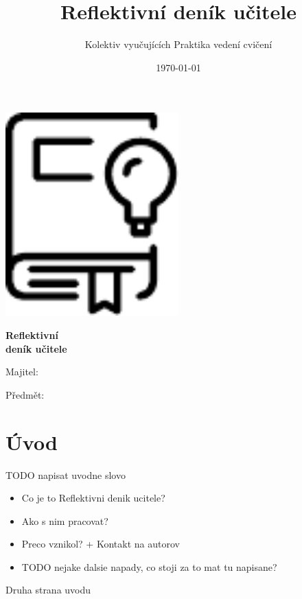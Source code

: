 \documentclass[twoside,openany,10pt]{book}
\title{Reflektivní deník učitele}
\author{Kolektiv vyučujících Praktika vedení cvičení}
\date{\today}
\begin{document}
\begin{titlepage}
	\centering
    \vspace*{1cm}
	\includegraphics[width=0.5\textwidth]{img/diary}\par
	\vspace{0.5cm}
	{\huge\bfseries Reflektivní\\ deník učitele\par}
	\vfill
	\raggedright
    \Large
	Majitel:\par
    \vspace{0.2cm}
    Předmět:\par
\end{titlepage}


\chapter*{Úvod}

TODO napisat uvodne slovo

\begin{itemize}
\item Co je to Reflektivni denik ucitele?
\item Ako s nim pracovat?
\item Preco vznikol? + Kontakt na autorov
\item TODO nejake dalsie napady, co stoji za to mat tu napisane?
\end{itemize}

\newpage
Druha strana uvodu


\end{document}
